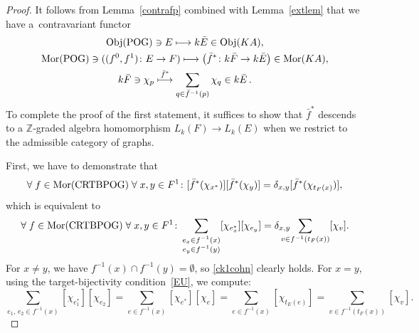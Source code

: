 \documentclass[12pt,times,a4paper]{amsart}
\numberwithin{equation}{section}
\numberwithin{equation}{section}
\begin{document}
\begin{proof}
It follows from Lemma~\ref{contrafp} combined 
with Lemma~\ref{extlem} that we have a~contravariant functor
\begin{gather}
\mathrm{Obj}({\rm POG})\ni E\stackrel{}{\longmapsto}k\bar{E}\in\mathrm{Obj}(KA),
\nonumber\\
\mathrm{Mor}({\rm POG})\ni ((f^0,f^1)\colon E\to F)
\stackrel{}{\longmapsto}\big(\bar{f}^*\colon k\bar{F}\to k\bar{E}\big)\in\mathrm{Mor}(KA),
\nonumber\\
k\bar{F}\ni \chi_p\stackrel{\bar{f}^*}{\longmapsto}\sum_{q\in \bar{f}^{-1}(p)}\chi_q\in k\bar{E} \,.
\end{gather}
To complete the proof of the first statement, it suffices to show that $\bar{f}^*$ descends to a $\mathbb{Z}$-graded algebra homomorphism 
$L_k(F)\to L_k(E)$ when we restrict to the admissible category of graphs.
 
First, we have to demonstrate that
\begin{equation}
\forall\;f\in\mathrm{Mor}({\rm CRTBPOG})\;\forall\;x,y\in F^1\colon
 [\bar{f}^*(\chi_{x^*})][\bar{f}^*(\chi_y)]=\delta_{x,y}[\bar{f}^*(\chi_{t_F(x)})],
\end{equation}
which is equivalent to
\begin{equation}\label{ck1cohn}
\forall\;f\in\mathrm{Mor}({\rm CRTBPOG})\;\forall\;x,y\in F^1\colon 
\sum_{\substack{e_x\in f^{-1}(x)\\ e_y\in f^{-1}(y)}}[\chi_{e_x^*}][\chi_{e_y}]
=\delta_{x,y}\hspace*{-4mm}\sum_{v\in f^{-1}(t_F(x))}[\chi_v].
\end{equation}
For $x\neq y$, we have $f^{-1}(x)\cap f^{-1}(y)=\emptyset$, so \eqref{ck1cohn} clearly holds.
For $x=y$, using the target-bijectivity condition~\eqref{EU}, we compute:
\begin{equation}
\sum_{e_1,\,e_2\in f^{-1}(x)}[\chi_{e_1^*}][\chi_{e_2}]
=
\sum_{e\in f^{-1}(x)}[\chi_{e^*}][\chi_{e}]
 =
\sum_{e\in f^{-1}(x)}[\chi_{t_E(e)}]
 =
\sum_{v\in f^{-1}(t_F(x))}[\chi_{v}].
\end{equation}


\end{proof}
\end{document}

